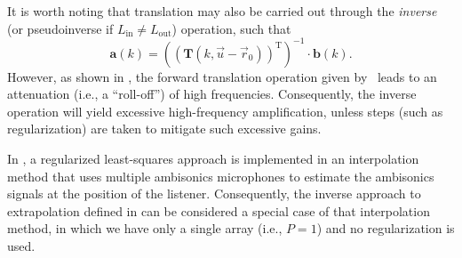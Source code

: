 It is worth noting that translation may also be carried out through the \textit{inverse} (or pseudoinverse if $L_\text{in} \neq L_\text{out}$) operation, such that
\begin{equation}\label{eq:03_Navigation_Techniques:Inverse_Ambisonics_Translation}
\mathbf{a}(k) = \left(\left( \mathbf{T}(k, \vec{u} - \vec{r}_0) \right)^\text{T} \right)^{-1} \cdot \mathbf{b}(k).
\end{equation}
However, as shown in , the forward translation operation given by~ leads to an attenuation (i.e., a ``roll-off'') of high frequencies.
Consequently, the inverse operation will yield excessive high-frequency amplification, unless steps (such as regularization) are taken to mitigate such excessive gains.

In , a regularized least-squares approach is implemented in an interpolation method that uses multiple ambisonics microphones to estimate the ambisonics signals at the position of the listener.
Consequently, the inverse approach to extrapolation defined in  can be considered a special case of that interpolation method, in which we have only a single array (i.e., $P = 1$) and no regularization is used.